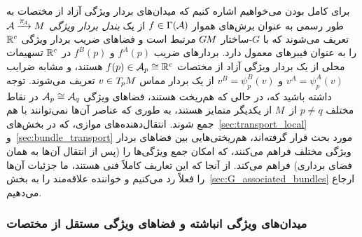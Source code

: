 				
				برای کامل بودن می‌خواهیم اشاره کنیم که میدان‌های بردار ویژگی آزاد از مختصات به طور رسمی به عنوان برش‌های هموار $f\in\Gamma(\mathcal{A})$ از یک \emph{بندل بردار ویژگی} $\A\piAarrow M$ تعریف می‌شوند که با $G$-ساختار $G\mkern-1.4muM$ مرتبط است و فضاهای ضریب بردار ویژگی $\mathbb{R}^c$ را به عنوان فیبرهای معمول دارد.
				بردارهای ضریب $f^A(p)$ و $f^B(p)$ در $\mathbb{R}^c$ تسهیمات محلی از یک بردار ویژگی آزاد از مختصات $f(p) \in \mathcal{A}_p \cong \mathbb{R}^c$ هستند، و مشابه ضرایب $v^A=\psi_p^A(v)$ و $v^B=\psi_p^B(v)$ از یک بردار مماس $v\in T_{\mkern-1.5mu p}\mkern-.5muM$ تعریف می‌شوند.
				توجه داشته باشید که، در حالی که هم‌ریخت هستند، فضاهای ویژگی $\mathcal{A}_p \cong \mathcal{A}_q$ در نقاط مختلف $p\neq q$ از~$M$ از یکدیگر متمایز هستند، به طوری که عناصر آن‌ها نمی‌توانند با هم جمع شوند.
				انتقال‌دهنده‌های موازی، که در بخش‌های~\ref{sec:transport_local} و~\ref{sec:bundle_transport} مورد بحث قرار گرفته‌اند، هم‌ریختی‌هایی بین فضاهای بردار ویژگی مختلف فراهم می‌کنند، که امکان جمع ویژگی‌ها را (پس از انتقال آن‌ها به همان فضای برداری) فراهم می‌کند.
				از آنجا که این تعاریف کاملاً فنی هستند، ما جزئیات آن‌ها را فعلاً رد می‌کنیم و خواننده علاقه‌مند را به بخش~\ref{sec:G_associated_bundles} ارجاع می‌دهیم.
				
				
				
				
				
				
				
				
				\subsubsection{میدان‌های ویژگی انباشته و فضاهای ویژگی مستقل از مختصات}
				\label{sec:stacked_fields}
				
